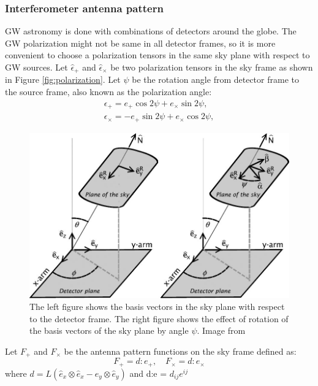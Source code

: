 \documentclass{ttuthes2007}
\begin{document}
\subsubsection{Interferometer antenna pattern}
\ac{GW} astronomy is done with combinations of detectors around the globe. The
\ac{GW} polarization might not be same in all detector frames, so it is more
convenient to choose a polarization tensors in the same sky plane with respect
to \ac{GW} sources. Let $\hat\epsilon_+$ and $\hat\epsilon_\times$ be two
polarization tensors in the sky frame as shown in Figure \ref{fig:polarization}. Let
$\psi$ be the rotation angle from detector frame to the source frame, also known
as the polarization angle:
\begin{equation}
\begin{aligned}
\epsilon_+ = e_+\cos{2\psi} + e_\times \sin{2\psi}, \\
\epsilon_\times = -e_+\sin{2\psi} + e_\times \cos2{\psi},
\end{aligned}
\end{equation}
\begin{figure}[h!]
	\includegraphics[width=\textwidth]{figure/antennae.jpg}
	\caption{The left figure shows the basis vectors in the sky plane with
respect to the detector frame. The right figure shows the effect of rotation of
the basis vectors of the sky plane by angle $\psi$. Image from
~\cite{Sathyaprakash_2009}}
\end{figure}  

Let $F_+$ and $F_\times$ be the antenna pattern functions on the sky frame
defined as:
\begin{equation}
F_+=d:e_+, \quad  F_\times=d:e_\times
\end{equation}
where $d=L(\hat{e}_x\otimes\hat{e}_x- \hat{e}_y\otimes\hat{e}_y)$ and d:e =
$d_{ij}e^{ij}$\\ 
\end{document}
